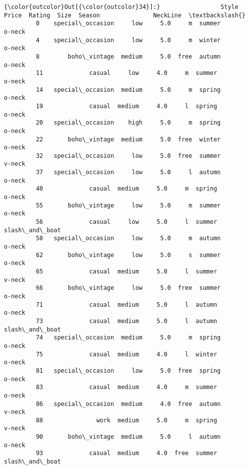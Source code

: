 \documentclass[11pt]{article}
\begin{document}
\begin{Verbatim}[commandchars=\\\{\}]
{\color{outcolor}Out[{\color{outcolor}34}]:}                 Style   Price  Rating  Size  Season               NeckLine  \textbackslash{}
         0    special\_occasion     low     5.0     m  summer                 o-neck   
         4    special\_occasion     low     5.0     m  winter                 o-neck   
         8        boho\_vintage  medium     5.0  free  autumn                 o-neck   
         11             casual     low     4.0     m  summer                 o-neck   
         14   special\_occasion  medium     5.0     m  spring                 o-neck   
         19             casual  medium     4.0     l  spring                 o-neck   
         20   special\_occasion    high     5.0     m  spring                 o-neck   
         22       boho\_vintage  medium     5.0  free  winter                 o-neck   
         32   special\_occasion     low     5.0  free  summer                 v-neck   
         37   special\_occasion     low     5.0     l  autumn                 o-neck   
         40             casual  medium     5.0     m  spring                 o-neck   
         55       boho\_vintage     low     5.0     m  summer                 o-neck   
         56             casual     low     5.0     l  summer         slash\_and\_boat   
         58   special\_occasion     low     5.0     m  autumn                 o-neck   
         62       boho\_vintage     low     5.0     s  summer                 o-neck   
         65             casual  medium     5.0     l  summer                 v-neck   
         66       boho\_vintage     low     5.0  free  summer                 o-neck   
         71             casual  medium     5.0     l  autumn                 o-neck   
         73             casual  medium     5.0     l  autumn         slash\_and\_boat   
         74   special\_occasion  medium     5.0     m  spring                 o-neck   
         75             casual  medium     4.0     l  winter                 o-neck   
         81   special\_occasion     low     5.0  free  spring                 o-neck   
         83             casual  medium     4.0     m  summer                 o-neck   
         86   special\_occasion  medium     4.0  free  autumn                 v-neck   
         88               work  medium     5.0     m  spring                 v-neck   
         90       boho\_vintage  medium     5.0     l  autumn                 o-neck   
         93             casual  medium     4.0  free  summer         slash\_and\_boat   

\end{Verbatim}
\end{document}
